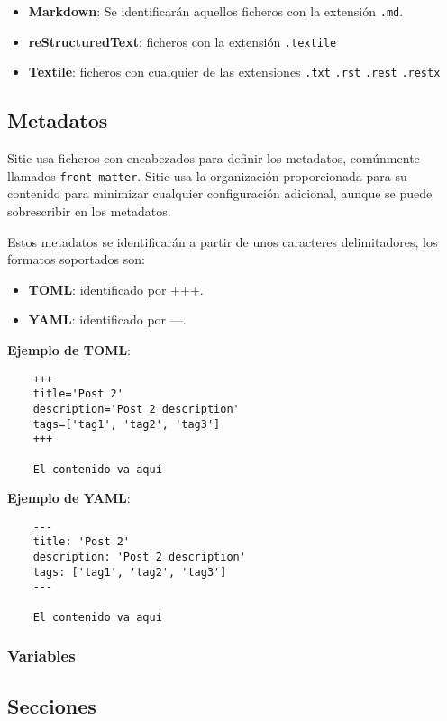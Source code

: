 \begin{itemize}
    \item \textbf{Markdown}: Se identificarán aquellos ficheros con la extensión \texttt{.md}.
    \item \textbf{reStructuredText}: ficheros con la extensión \texttt{.textile}
    \item \textbf{Textile}: ficheros con cualquier de las extensiones \texttt{.txt} \texttt{.rst} \texttt{.rest} \texttt{.restx}
\end{itemize}

\subsection{Metadatos}

Sitic usa ficheros con encabezados para definir los metadatos, comúnmente llamados \texttt{front matter}.
Sitic usa la organización proporcionada para su contenido para minimizar cualquier
configuración adicional, aunque se puede sobrescribir en los metadatos.

Estos metadatos se identificarán a partir de unos caracteres delimitadores, los formatos soportados son:

\begin{itemize}
    \item \textbf{TOML}: identificado por +++.
    \item \textbf{YAML}: identificado por ---.
\end{itemize}

\textbf{Ejemplo de TOML}:

\begin{verbatim}
    +++
    title='Post 2'
    description='Post 2 description'
    tags=['tag1', 'tag2', 'tag3']
    +++

    El contenido va aquí
\end{verbatim}

\textbf{Ejemplo de YAML}:

\begin{verbatim}
    ---
    title: 'Post 2'
    description: 'Post 2 description'
    tags: ['tag1', 'tag2', 'tag3']
    ---

    El contenido va aquí
\end{verbatim}

\subsubsection{Variables}

\subsection{Secciones}

